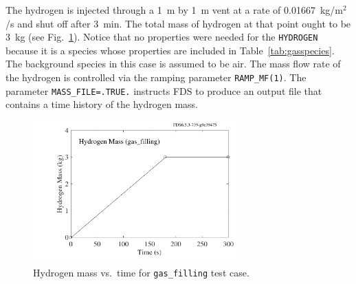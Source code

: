 \documentclass[11pt]{book}
\newcommand{\ct}{\tt\small}
\begin{document}
\noindent
The hydrogen is injected through a 1~m by 1~m vent at a rate of 0.01667~kg/m$^2$/s and shut off after 3~min. The total mass of hydrogen at that point ought to be 3~kg (see Fig.~\ref{gas_filling}). Notice that no properties were needed for the {\ct HYDROGEN} because it is a species whose properties are included in Table~\ref{tab:gasspecies}. The background species in this case is assumed to be air. The mass flow rate of the hydrogen is controlled via the ramping parameter {\ct RAMP\_MF(1)}. The parameter {\ct MASS\_FILE=.TRUE.} instructs FDS to produce an output file that contains a time history of the hydrogen mass.
\begin{figure}[h!]
\begin{center}
\includegraphics[width=3.1in]{SCRIPT_FIGURES/gas_filling_mass}
\end{center}
\caption[Results of the {\ct gas\_filling} test case]{Hydrogen mass vs.~time for {\ct gas\_filling} test case.}
\label{gas_filling}
\end{figure}
\end{document}
